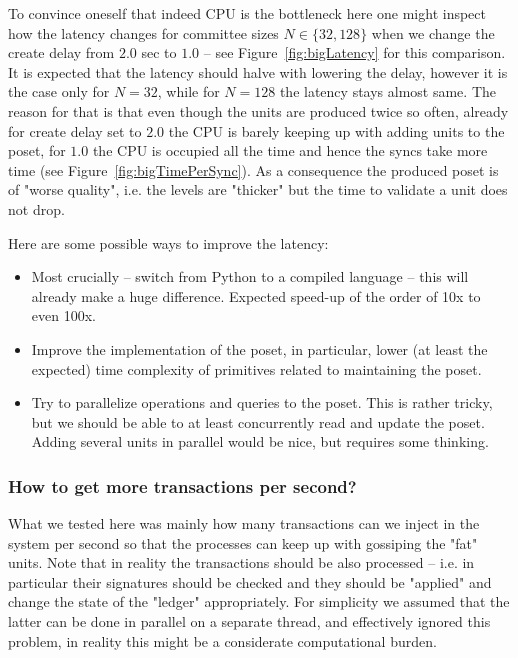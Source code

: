 \documentclass[a4paper,10pt]{article}
\begin{document}
				To convince oneself that indeed CPU is the bottleneck here one might inspect how the latency changes for committee sizes $N \in \{32, 128\}$
				when we change the create delay from $2.0$ sec to $1.0$ -- see Figure~\ref{fig:bigLatency} for this comparison.
				It is expected that the latency should halve with lowering the delay, however it is the case only for $N=32$, while for $N=128$ the latency stays almost same.
				The reason for that is that even though the units are produced twice so often, already for create delay set to $2.0$ the CPU is barely keeping up with adding units to the poset, for $1.0$ the CPU is occupied all the time and hence the syncs take more time (see Figure~\ref{fig:bigTimePerSync}). As a consequence the produced poset is of "worse quality", i.e. the levels are "thicker" but the time to validate a unit does not drop.

				Here are some possible ways to improve the latency:
				\begin{itemize}
					\item Most crucially -- switch from Python to a compiled language -- this will already make a huge difference. Expected speed-up of the order of 10x to even 100x.
					\item Improve the implementation of the poset, in particular, lower (at least the expected) time complexity of primitives related to
					maintaining the poset.
					\item Try to parallelize operations and queries to the poset. This is rather tricky, but we should be able to at least concurrently read and update the poset. Adding several units in parallel would be nice, but requires some thinking.
				\end{itemize}

			\subsubsection*{How to get more transactions per second?}
				What we tested here was mainly how many transactions can we inject in the system per second so that the processes can keep up with gossiping the "fat" units.
				Note that in reality the transactions should be also processed -- i.e. in particular their signatures should be checked and they should be "applied" and change the state of the "ledger" appropriately.
				For simplicity we assumed that the latter can be done in parallel on a separate thread, and effectively ignored this problem, in reality this might be a considerate computational burden.
\end{document}
